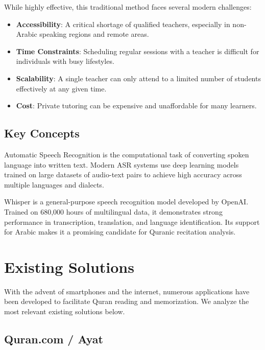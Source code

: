 While highly effective, this traditional method faces several modern challenges:
\begin{itemize}
  \item \textbf{Accessibility}: A critical shortage of qualified teachers, especially in non-Arabic speaking regions and remote areas.
  \item \textbf{Time Constraints}: Scheduling regular sessions with a teacher is difficult for individuals with busy lifestyles.
  \item \textbf{Scalability}: A single teacher can only attend to a limited number of students effectively at any given time.
  \item \textbf{Cost}: Private tutoring can be expensive and unaffordable for many learners.
\end{itemize}

\subsection{Key Concepts}

\begin{emeraldbox}[title=Automatic Speech Recognition (ASR)]
Automatic Speech Recognition is the computational task of converting spoken language into written text. Modern ASR systems use deep learning models trained on large datasets of audio-text pairs to achieve high accuracy across multiple languages and dialects.
\end{emeraldbox}

\begin{emeraldbox}[title=Whisper Model]
Whisper is a general-purpose speech recognition model developed by OpenAI. Trained on 680,000 hours of multilingual data, it demonstrates strong performance in transcription, translation, and language identification. Its support for Arabic makes it a promising candidate for Quranic recitation analysis.
\end{emeraldbox}

\section{Existing Solutions}
\label{sec:soa_existing}

With the advent of smartphones and the internet, numerous applications have been developed to facilitate Quran reading and memorization. We analyze the most relevant existing solutions below.

\subsection{Quran.com / Ayat}

